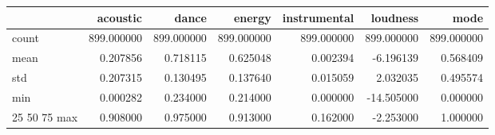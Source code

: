 \begin{tabular}{lrrrrrr}
\toprule
 & acoustic & dance & energy & instrumental & loudness & mode \\
\midrule
count & 899.000000 & 899.000000 & 899.000000 & 899.000000 & 899.000000 & 899.000000 \\
mean & 0.207856 & 0.718115 & 0.625048 & 0.002394 & -6.196139 & 0.568409 \\
std & 0.207315 & 0.130495 & 0.137640 & 0.015059 & 2.032035 & 0.495574 \\
min & 0.000282 & 0.234000 & 0.214000 & 0.000000 & -14.505000 & 0.000000 \\
25%
50%
75%
max & 0.908000 & 0.975000 & 0.913000 & 0.162000 & -2.253000 & 1.000000 \\
\bottomrule
\end{tabular}
